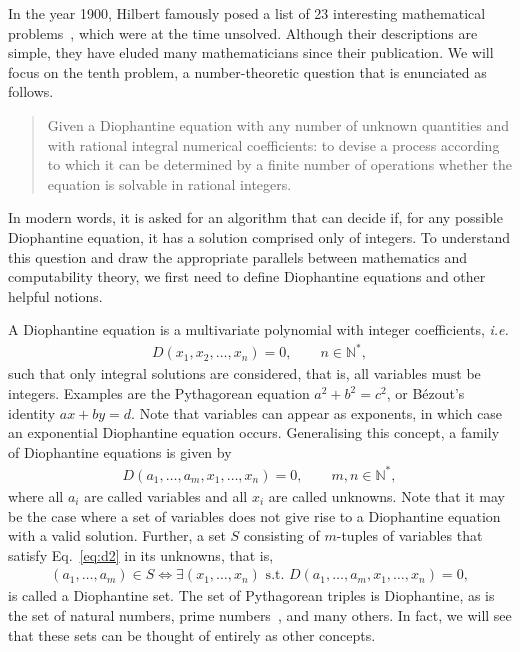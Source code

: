 \documentclass[12pt]{article}
\begin{document}
In the year 1900, Hilbert famously posed a list of 23 interesting mathematical problems~\cite{}, which were at the time unsolved. Although their descriptions are simple, they have eluded many mathematicians since their publication. We will focus on the tenth problem, a number-theoretic question that is enunciated as follows.

\begin{quote}
    Given a Diophantine equation with any number of unknown quantities and with rational integral numerical coefficients: to devise a process according to which it can be determined by a finite number of operations whether the equation is solvable in rational integers.
\end{quote}

In modern words, it is asked for an algorithm that can decide if, for any possible Diophantine equation, it has a solution comprised only of integers. To understand this question and draw the appropriate parallels between mathematics and computability theory, we first need to define Diophantine equations and other helpful notions.

A Diophantine equation is a multivariate polynomial with integer coefficients, \emph{i.e.}
\begin{align}
    D(x_{1}, x_{2}, \dots, x_{n}) = 0, \qquad n \in \mathbb{N}^{*}, \label{eq:d1}
\end{align}
such that only integral solutions are considered, that is, all variables must be integers. Examples are the Pythagorean equation $a^{2} + b^{2} = c^{2}$, or Bézout's identity $ax + by = d$. Note that variables can appear as exponents, in which case an exponential Diophantine equation occurs. Generalising this concept, a family of Diophantine equations is given by
\begin{align}
    D(a_{1}, \dots, a_{m}, x_{1}, \dots, x_{n}) = 0, \qquad m, n \in \mathbb{N}^{*}, \label{eq:d2}
\end{align}
where all $a_{i}$ are called variables and all $x_{i}$ are called unknowns. Note that it may be the case where a set of variables does not give rise to a Diophantine equation with a valid solution. Further, a set $S$ consisting of $m$-tuples of variables that satisfy Eq.~\ref{eq:d2} in its unknowns, that is,
\begin{align}
    (a_{1}, \dots, a_{m}) \in S \Leftrightarrow \exists (x_{1}, \dots, x_{n}) \text{ s.t. } D(a_{1}, \dots, a_{m}, x_{1}, \dots, x_{n}) = 0,
\end{align}
is called a Diophantine set. The set of Pythagorean triples is Diophantine, as is the set of natural numbers, prime numbers~\cite{}, and many others. In fact, we will see that these sets can be thought of entirely as other concepts.
\end{document}

